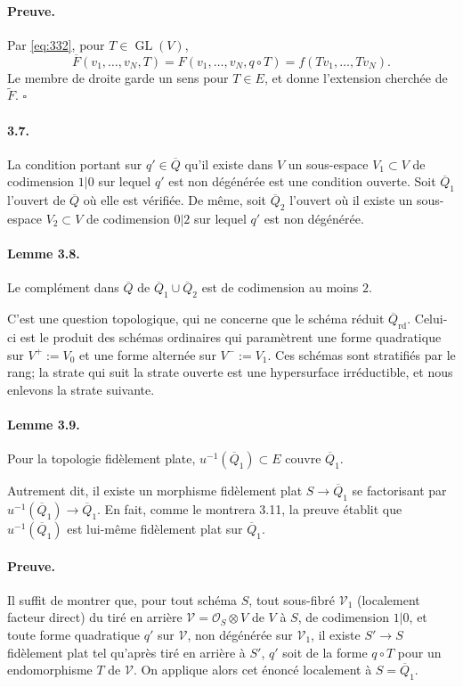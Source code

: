 \documentclass[11pt]{article}
\newcommand{\GL}{\operatorname{GL}}
\newcommand{\rd}{\mathrm{rd}}
\newcommand{\calO}{\mathcal O}
\newcommand{\barQ}{\overline Q}
\begin{document}
\paragraph{Preuve.}
Par \eqref{eq:332}, pour $T\in\GL(V)$,
\[
\overline F(v_1,\ldots,v_N,T)=F(v_1,\ldots,v_N,q\circ T)=f(Tv_1,\ldots,Tv_N).
\]
Le membre de droite garde un sens pour $T\in E$, et donne l'extension cherchée de $\widetilde F$. \hfill $\square$

\paragraph{3.7.}
La condition portant sur $q'\in\barQ$ qu'il existe dans $V$ un sous-espace $V_1\subset V$ de codimension $1|0$ sur lequel $q'$ est non dégénérée est une condition ouverte. Soit $\barQ_1$ l'ouvert de $\barQ$ où elle est vérifiée. De même, soit $\barQ_2$ l'ouvert où il existe un sous-espace $V_2\subset V$ de codimension $0|2$ sur lequel $q'$ est non dégénérée.

\paragraph{Lemme 3.8.}
Le complément dans $\barQ$ de $\barQ_1\cup\barQ_2$ est de codimension au moins $2$.

C'est une question topologique, qui ne concerne que le schéma réduit $\barQ_{\rd}$. Celui-ci est le produit des schémas ordinaires qui paramètrent une forme quadratique sur $V^+:=V_0$ et une forme alternée sur $V^-:=V_1$. Ces schémas sont stratifiés par le rang; la strate qui suit la strate ouverte est une hypersurface irréductible, et nous enlevons la strate suivante.

\paragraph{Lemme 3.9.}
Pour la topologie fidèlement plate, $u^{-1}(\barQ_1)\subset E$ couvre $\barQ_1$.

Autrement dit, il existe un morphisme fidèlement plat $S\to\barQ_1$ se factorisant par $u^{-1}(\barQ_1)\to\barQ_1$. En fait, comme le montrera 3.11, la preuve établit que $u^{-1}(\barQ_1)$ est lui-même fidèlement plat sur $\barQ_1$.

\paragraph{Preuve.}
Il suffit de montrer que, pour tout schéma $S$, tout sous-fibré $\mathcal V_1$ (localement facteur direct) du tiré en arrière $\mathcal V=\calO_S\otimes V$ de $V$ à $S$, de codimension $1|0$, et toute forme quadratique $q'$ sur $\mathcal V$, non dégénérée sur $\mathcal V_1$, il existe $S'\to S$ fidèlement plat tel qu'après tiré en arrière à $S'$, $q'$ soit de la forme $q\circ T$ pour un endomorphisme $T$ de $\mathcal V$. On applique alors cet énoncé localement à $S=\barQ_1$.
\end{document}
